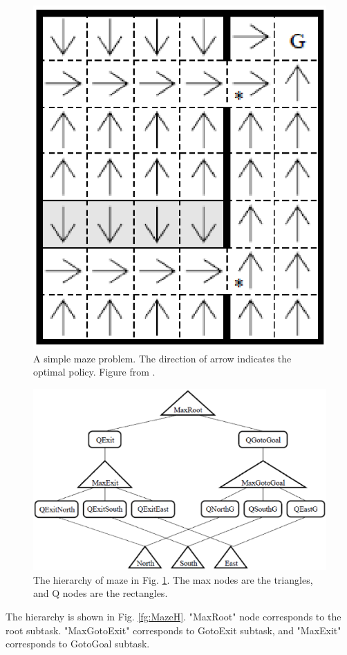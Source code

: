 \begin{figure}[h]
    \centering
    \begin{minipage}[t]{0.4\linewidth}
        \centering
        \includegraphics[width=\textwidth] {./figures/Maze.eps}
    \end{minipage}
    \caption{A simple maze problem. The direction of arrow indicates the optimal policy. Figure from \cite{MaxQJ}.}
    \label{fig:Maze}
\end{figure}
\begin{figure}[h]
    \centering
    \begin{minipage}[t]{0.8\linewidth}
        \centering
        \includegraphics[width=\textwidth] {./figures/MazeH.eps}
    \end{minipage}
    \caption{The hierarchy of maze in Fig. \ref{fig:Maze}. The max nodes are the triangles, and Q nodes are the rectangles. }
    \label{fig:MazeH}
\end{figure}
The hierarchy is shown in Fig. \ref{fg:MazeH}.
"MaxRoot" node corresponds to the root subtask. "MaxGotoExit" corresponds to GotoExit subtask,
and "MaxExit" corresponds to GotoGoal subtask.

